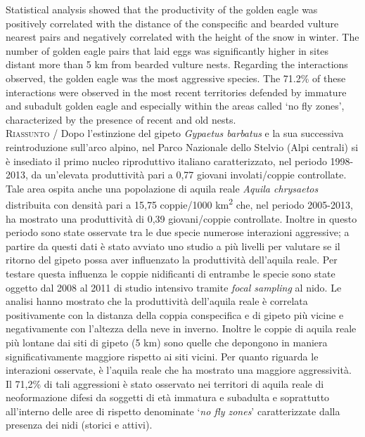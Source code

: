 {Statistical analysis showed that the productivity of the golden eagle
was positively correlated with the distance of the conspecific and
bearded vulture nearest pairs and negatively correlated with the height
of the snow in winter. The number of golden eagle pairs that laid eggs
was significantly higher in sites distant more than 5 km from bearded
vulture nests. Regarding the interactions observed, the golden eagle
was the most aggressive species. The 71.2\% of these interactions were
observed in the most recent territories defended by immature and
subadult golden eagle and especially within the areas called
{\textquoteleft}no fly zones{\textquoteright}, characterized by the
presence of recent and old nests.   \\
\noindent \textsc{\color{MUSEBLUE} Riassunto} / Dopo l{\textquoteright}estinzione del gipeto \textit{Gypaetus barbatus}
e la sua successiva reintroduzione sull{\textquoteright}arco alpino,
nel Parco Nazionale dello Stelvio (Alpi centrali) si \`e insediato il
primo nucleo riproduttivo italiano caratterizzato, nel periodo
1998-2013, da un{\textquoteright}elevata produttivit\`a pari a 0,77
giovani involati/coppie controllate. Tale area ospita anche una
popolazione di aquila reale \textit{Aquila chrysaetos} distribuita con
densit\`a pari a 15,75 coppie/1000 km\textsuperscript{2 }che, nel
periodo 2005-2013, ha mostrato una produttivit\`a di 0,39
giovani/coppie controllate. 
Inoltre in questo periodo sono state osservate tra le due specie
numerose interazioni aggressive; a partire da questi dati \`e stato
avviato uno studio a pi\`u livelli per valutare se il ritorno del
gipeto possa aver influenzato la produttivit\`a
dell{\textquoteright}aquila reale. Per testare questa influenza le
coppie nidificanti di entrambe le specie sono state oggetto dal 2008 al
2011 di studio intensivo tramite \textit{focal sampling} al nido.
Le analisi hanno mostrato che la produttivit\`a
dell{\textquoteright}aquila reale \`e correlata positivamente con la
distanza della coppia conspecifica e di gipeto pi\`u vicine e
negativamente con l{\textquoteright}altezza della neve in inverno.
Inoltre le coppie di aquila reale pi\`u lontane dai siti di gipeto
(5 km) sono quelle che depongono in maniera
significativamente maggiore rispetto ai siti vicini. Per quanto
riguarda le interazioni osservate, \`e l{\textquoteright}aquila reale
che ha mostrato una maggiore aggressivit\`a.  Il 71,2\% di tali
aggressioni \`e stato osservato nei territori di aquila reale di
neoformazione difesi da soggetti di et\`a immatura e subadulta e
soprattutto all{\textquoteright}interno delle aree di rispetto
denominate {\textquoteleft}\textit{no fly zones}{\textquoteright}
caratterizzate dalla presenza dei nidi (storici e attivi).
}



